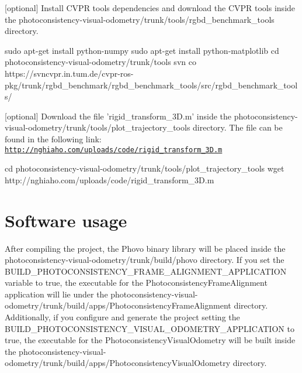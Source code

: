 \begin{DoxyItemize}
\item \mbox{[}optional\mbox{]} Install CVPR tools dependencies and download the CVPR tools inside the photoconsistency-\/visual-\/odometry/trunk/tools/rgbd\_\-benchmark\_\-tools directory. \begin{DoxyVerb}
sudo apt-get install python-numpy
sudo apt-get install python-matplotlib 
cd photoconsistency-visual-odometry/trunk/tools
svn co https://svncvpr.in.tum.de/cvpr-ros-pkg/trunk/rgbd_benchmark/rgbd_benchmark_tools/src/rgbd_benchmark_tools/
\end{DoxyVerb}

\end{DoxyItemize}


\begin{DoxyItemize}
\item \mbox{[}optional\mbox{]} Download the file 'rigid\_\-transform\_\-3D.m' inside the photoconsistency-\/visual-\/odometry/trunk/tools/plot\_\-trajectory\_\-tools directory. The file can be found in the following link: \href{http://nghiaho.com/uploads/code/rigid_transform_3D.m}{\tt http://nghiaho.com/uploads/code/rigid\_\-transform\_\-3D.m} \begin{DoxyVerb}
cd photoconsistency-visual-odometry/trunk/tools/plot_trajectory_tools
wget http://nghiaho.com/uploads/code/rigid_transform_3D.m
\end{DoxyVerb}

\end{DoxyItemize}\hypertarget{index_usage_sec}{}\section{Software usage}\label{index_usage_sec}
After compiling the project, the Phovo binary library will be placed inside the photoconsistency-\/visual-\/odometry/trunk/build/phovo directory. If you set the BUILD\_\-PHOTOCONSISTENCY\_\-FRAME\_\-ALIGNMENT\_\-APPLICATION variable to true, the executable for the PhotoconsistencyFrameAlignment application will lie under the photoconsistency-\/visual-\/odometry/trunk/build/apps/PhotoconsistencyFrameAlignment directory. Additionally, if you configure and generate the project setting the BUILD\_\-PHOTOCONSISTENCY\_\-VISUAL\_\-ODOMETRY\_\-APPLICATION to true, the executable for the PhotoconsistencyVisualOdometry will be built inside the photoconsistency-\/visual-\/odometry/trunk/build/apps/PhotoconsistencyVisualOdometry directory.

